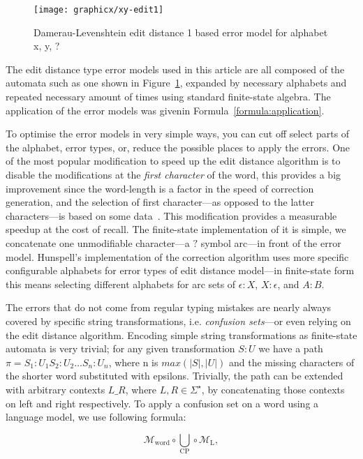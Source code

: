 \documentclass[a4paper,12pt]{article}
\begin{document}
\begin{figure}
    \centering
    \texttt{[image: graphicx/xy-edit1]}
    \caption{Damerau-Levenshtein edit distance 1 based error model for
        alphabet {x, y, ?}
    \label{fig:xy-edit-1}}
\end{figure}

The edit distance type error models used in this article are all composed of
the automata such as one shown in Figure~\ref{fig:xy-edit-1}, expanded by
necessary alphabets and repeated necessary amount of times using standard
finite-state algebra. The application of the error models was givenin
Formula~\ref{formula:application}.

To optimise the error models in very simple ways, you can cut off select parts
of the alphabet, error types, or, reduce the possible places to apply the
errors.  One of the most popular modification to speed up the edit distance
algorithm is to disable the modifications at the \emph{first character} of the
word, this provides a big improvement since the word-length is a factor in the
speed of correction generation, and the selection of first character---as
opposed to the latter characters---is based on some
data~\cite[]{bhagat2007spelling}.  This modification provides a
measurable speedup at the cost of recall. The finite-state implementation of it
is simple, we concatenate one unmodifiable character---a $?$ symbol arc---in
front of the error model.  Hunspell's implementation of the correction
algorithm uses more specific configurable alphabets for error types of edit
distance model---in finite-state form this means selecting different alphabets
for arc sets of $\epsilon:X$, $X:\epsilon$, and $A:B$.

The errors that do not come from regular typing mistakes are
nearly always covered by specific string transformations, i.e.
\emph{confusion sets}---or even relying on the edit distance algorithm.
Encoding simple string transformations as finite-state automata is very
trivial; for any given transformation $S:U$ we have a path $\pi = S_1:U_1
S_2:U_2 \ldots S_n:U_n$, where n is $max(|S|, |U|)$ and the missing characters
of the shorter word substituted with epsilons.  Trivially, the path can be
extended with arbitrary contexts $L \_ R$, where $L, R \in \Sigma^{\star}$, by
concatenating those contexts on left and right respectively. To apply a
confusion set on a word using a language model, we use following formula:

\begin{equation}
    \mathcal{M}_{\mathrm{word}} \circ \bigcup_{\mathrm{CP}} \circ \mathcal{M}_{\mathrm{L}},
\end{equation}
\end{document}
